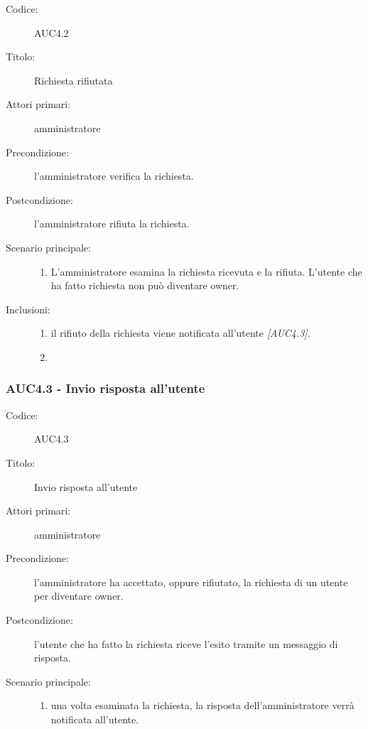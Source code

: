 \documentclass[../analisi-dei-requisiti.tex]{subfiles}
\begin{document}
\begin{description}
  \item[Codice:] AUC4.2
  \item[Titolo:] Richiesta rifiutata
  \item[Attori primari:] amministratore
  \item[Precondizione:] l'amministratore verifica la richiesta.
  \item[Postcondizione:] l'amministratore rifiuta la richiesta.
  \item[Scenario principale:]
  \begin{enumerate}
    \item L'amministratore esamina la richiesta ricevuta e la rifiuta. L'utente che ha fatto richiesta non può diventare owner.
  \end{enumerate}
  \item[Inclusioni:]
  \begin{enumerate}
    \item il rifiuto della richiesta viene notificata all'utente \emph{[AUC4.3]}.
    \item
  \end{enumerate}
\end{description}

\subsubsection{AUC4.3 - Invio risposta all'utente}%
\label{subsub:AUC4.3}

\begin{description}
  \item[Codice:] AUC4.3
  \item[Titolo:] Invio risposta all'utente
  \item[Attori primari:] amministratore
  \item[Precondizione:] l'amministratore ha accettato, oppure rifiutato, la richiesta di un utente per diventare owner.
  \item[Postcondizione:] l'utente che ha fatto la richiesta riceve l'esito tramite un messaggio di risposta.
  \item[Scenario principale:]
  \begin{enumerate}
    \item una volta esaminata la richiesta, la risposta dell'amministratore verrà notificata all'utente.
  \end{enumerate}
\end{description}
\end{document}
